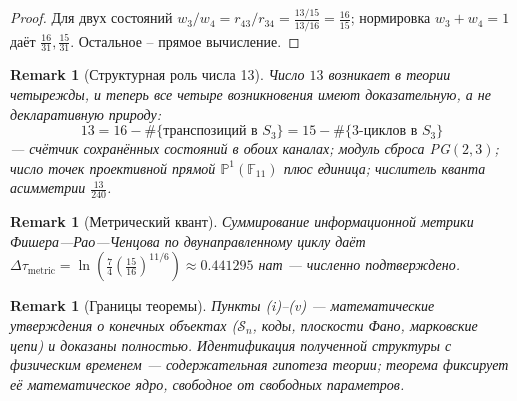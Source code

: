 \documentclass[11pt,a4paper]{article}
\newtheorem{remark}[theorem]{Remark}
\newcommand{\S}{\mathcal{S}}
\begin{document}
\begin{proof}
Для двух состояний $w_3/w_4 = r_{43}/r_{34} = \frac{13/15}{13/16} = \frac{16}{15}$;
нормировка $w_3 + w_4 = 1$ даёт $\frac{16}{31}, \frac{15}{31}$. Остальное --
прямое вычисление.
\end{proof}

\begin{remark}[Структурная роль числа 13]
Число $13$ возникает в теории четырежды, и теперь все четыре возникновения
имеют доказательную, а не декларативную природу:
\[
13 = 16 - \#\{\text{транспозиций в } S_3\} = 15 - \#\{\text{3-циклов в } S_3\}
\]
--- счётчик сохранённых состояний в обоих каналах; модуль сброса PG$(2,3)$;
число точек проективной прямой $\mathbb{P}^1(\mathbb{F}_{11})$ плюс единица;
числитель кванта асимметрии $\frac{13}{240}$.
\end{remark}

\begin{remark}[Метрический квант]
Суммирование информационной метрики Фишера---Рао---Ченцова по двунаправленному
циклу даёт $\Delta\tau_{\mathrm{metric}} = \ln\!\left(\frac{7}{4}\left(\frac{15}{16}\right)^{11/6}\right)
\approx 0.441295$ нат --- численно подтверждено.
\end{remark}

\begin{remark}[Границы теоремы]
Пункты (i)--(v) --- математические утверждения о конечных объектах
($\S_n$, коды, плоскости Фано, марковские цепи) и доказаны полностью.
Идентификация полученной структуры с физическим временем --- содержательная
гипотеза теории; теорема фиксирует её математическое ядро, свободное от
свободных параметров.
\end{remark}
\end{document}

